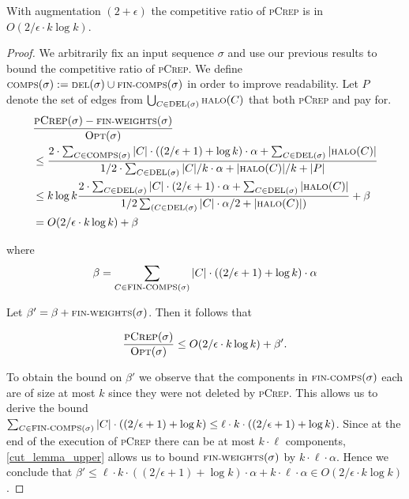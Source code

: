 \documentclass[a4paper,UKenglish,cleveref, autoref, thm-restate,authorcolumns]{lipics-v2019}
\newcommand{\adjDel}{\textsc{pCrep}}
\newcommand{\del}{\text{\scriptsize DEL}}
\newcommand{\opt}{\text{O{\scriptsize PT}}}
\newcommand{\halo}{\text{\scriptsize HALO}}
\newcommand{\finalComps}{\text{\scriptsize FIN-COMPS}}
\newcommand{\finalWeights}{\text{\scriptsize FIN-WEIGHTS}}
\newcommand{\comps}{\text{\scriptsize COMPS}}
\begin{document}
\begin{theorem}
	\label{comp_ratio_theo}
	With augmentation $(2+\epsilon)$ the competitive ratio of \adjDel{} is in $O(2/\epsilon\cdot k \log k)$.
\end{theorem}

\begin{proof}
	We arbitrarily fix an input sequence $\sigma$ and use our previous results to bound the competitive ratio of \adjDel{}. We define $\comps(\sigma):=\del{}(\sigma)\cup\finalComps(\sigma)$ in order to improve readability. Let $P$ denote the set of edges from $\bigcup_{C\in\del{}(\sigma)}\halo{}(C)$ that both \adjDel{} and \opt{} pay for.
	\begingroup
	\addtolength{\jot}{1em}
	\begin{align*}
	&\frac{\adjDel{}(\sigma)-\finalWeights(\sigma)}{\opt(\sigma)}\\ 
	&\leq\frac{2\cdot\sum_{C\in\comps(\sigma)}|C|\cdot((2/\epsilon+1)+\log k)\cdot\alpha +\sum_{C\in\del{}(\sigma)} |\halo(C)|}{1/2\cdot\sum_{C\in\del{}(\sigma)}|C|/k\cdot\alpha+|\halo(C)|/k +|P|}\\
	&\leq k \log k\frac{2\cdot\sum_{C\in\del(\sigma)}|C|\cdot(2/\epsilon+1) \cdot\alpha+\sum_{C\in\del{}(\sigma)}|\halo(C)|}{1/2\sum_{(C\in\del{}(\sigma)}|C|\cdot\alpha/2+|\halo(C)|)}+\beta\\
	& = O(2/\epsilon\cdot k \log k) +\beta
	\end{align*}
	\endgroup
	
	\noindent where
	\begin{align*}
	\beta=\sum_{C\in \finalComps(\sigma)}|C|\cdot((2/\epsilon+1)+\log k)\cdot\alpha
	\end{align*}
	
	\noindent Let $\beta'=\beta+\finalWeights(\sigma)$. Then it follows that
	
	\begin{align*}
	\frac{\adjDel{}(\sigma)}{\opt(\sigma)}\leq O(2/\epsilon\cdot k \log k) +\beta'.
	\end{align*}
	
	To obtain the bound on $\beta'$ we observe that the components in $\finalComps(\sigma)$ each are of size at most $k$ since they were not deleted by \adjDel{}. This allows us to derive the bound $\sum_{C\in \finalComps(\sigma)}|C|\cdot((2/\epsilon+1)+\log k)\leq \ell \cdot k \cdot ((2/\epsilon+1)+\log k)$. Since at the end of the execution of \adjDel{} there can be at most $k\cdot \ell$ components, \cref{cut_lemma_upper} allows us to bound $\finalWeights(\sigma)$ by $k\cdot \ell \cdot\alpha$. Hence we conclude that $\beta'\leq \ell\cdot k \cdot
	((2/\epsilon+1)+\log k)\cdot\alpha+k\cdot \ell\cdot \alpha\in O(2/\epsilon\cdot k \log k)$.
\end{proof}
\end{document}
